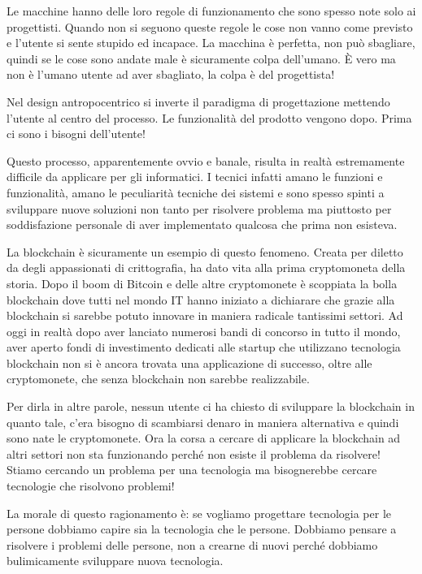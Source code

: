 Le macchine hanno delle loro regole di funzionamento che sono spesso note solo ai progettisti. Quando non si seguono queste regole le cose non vanno come previsto e l'utente si sente stupido ed incapace. La macchina è perfetta, non può sbagliare, quindi se le cose sono andate male è sicuramente colpa dell'umano. 
È vero ma non è l'umano utente ad aver sbagliato, la colpa è del progettista!

Nel design antropocentrico si inverte il paradigma di progettazione mettendo l'utente al centro del processo. Le funzionalità del prodotto vengono dopo. Prima ci sono i bisogni dell'utente!

Questo processo, apparentemente ovvio e banale, risulta in realtà estremamente difficile da applicare per gli informatici. I tecnici infatti amano le funzioni e funzionalità, amano le peculiarità tecniche dei sistemi e sono spesso spinti a sviluppare nuove soluzioni non tanto per risolvere problema ma piuttosto per soddisfazione personale di aver implementato qualcosa che prima non esisteva.

La blockchain è sicuramente un esempio di questo fenomeno. Creata per diletto da degli appassionati di crittografia, ha dato vita alla prima cryptomoneta della storia. Dopo il boom di Bitcoin e delle altre cryptomonete è scoppiata la bolla blockchain dove tutti nel mondo IT hanno iniziato a dichiarare che grazie alla blockchain si sarebbe potuto innovare in maniera radicale tantissimi settori. Ad oggi in realtà dopo aver lanciato numerosi bandi di concorso in tutto il mondo, aver aperto fondi di investimento dedicati alle startup che utilizzano tecnologia blockchain non si è ancora trovata una applicazione di successo, oltre alle cryptomonete, che senza blockchain non sarebbe realizzabile.

Per dirla in altre parole, nessun utente ci ha chiesto di sviluppare la blockchain in quanto tale, c'era bisogno di scambiarsi denaro in maniera alternativa e quindi sono nate le cryptomonete. Ora la corsa a cercare di applicare la blockchain ad altri settori non sta funzionando perché non esiste il problema da risolvere! Stiamo cercando un problema per una tecnologia ma bisognerebbe cercare tecnologie che risolvono problemi!

La morale di questo ragionamento è: se vogliamo progettare tecnologia per le persone dobbiamo capire sia la tecnologia che le persone. Dobbiamo pensare a risolvere i problemi delle persone, non a crearne di nuovi perché dobbiamo bulimicamente sviluppare nuova tecnologia.


